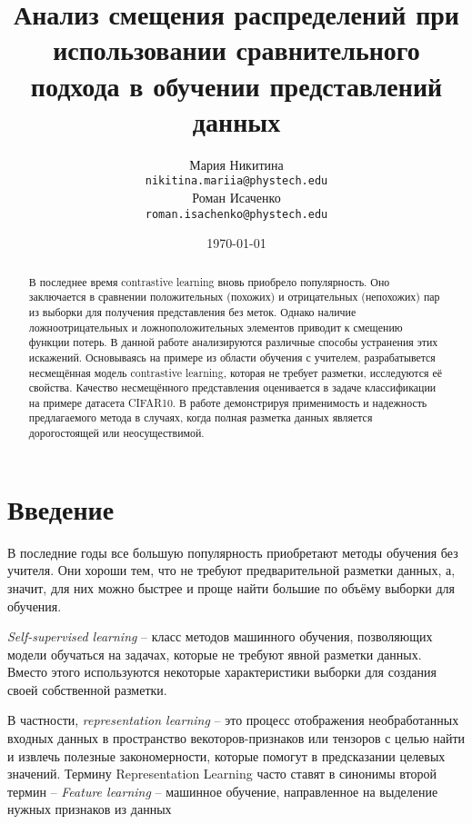 \documentclass[a4paper, 12pt]{article}
\title{Анализ смещения распределений при использовании сравнительного подхода в обучении представлений данных}
\author{
    Мария Никитина \\
	\texttt{nikitina.mariia@phystech.edu} \\
	\And
 	Роман Исаченко \\
	\texttt{roman.isachenko@phystech.edu}
}
\date{\today}
\begin{document}
\maketitle

\begin{abstract}
В последнее время contrastive learning вновь приобрело популярность. Оно заключается в сравнении положительных (похожих) и отрицательных (непохожих) пар из выборки для получения представления без меток. Однако наличие ложноотрицательных и ложноположительных элементов приводит к смещению функции потерь. В данной работе анализируются различные способы устранения этих искажений. Основываясь на примере из области обучения с учителем, разрабатывется несмещённая модель contrastive learning, которая не требует разметки, исследуются её свойства. Качество несмещённого представления оценивается в задаче классификации на примере датасета CIFAR10. В работе демонстрируя применимость и надежность предлагаемого метода в случаях, когда полная разметка данных является дорогостоящей или неосуществимой.
\end{abstract}


\section{Введение}

В последние годы все большую популярность приобретают методы обучения без учителя. Они хороши тем, что не требуют предварительной разметки данных, а, значит, для них можно быстрее и проще найти большие по объёму выборки для обучения.

\textit{Self-supervised learning} -- класс методов машинного обучения, позволяющих модели обучаться на задачах, которые не требуют явной разметки данных. Вместо этого используются некоторые характеристики выборки для создания своей собственной разметки.

В частности, \textit{representation learning} -- это процесс отображения необработанных входных данных в пространство векоторов-признаков или тензоров с целью найти и извлечь полезные закономерности, которые помогут в предсказании целевых значений. Термину Representation Learning часто ставят в синонимы второй термин – \textit{Feature learning} – машинное обучение, направленное на выделение нужных признаков из данных
\end{document}
